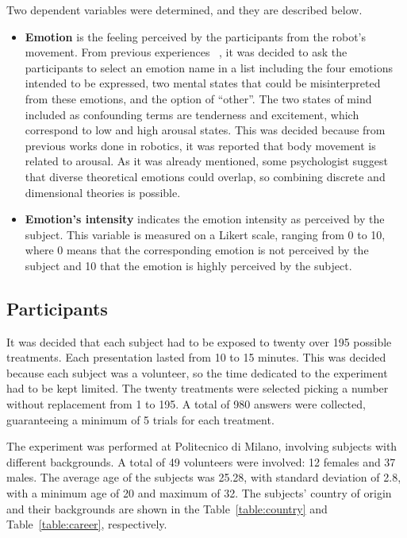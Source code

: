 Two dependent variables were determined, and they are described below.

\begin{itemize}
	\item \textbf{Emotion} is the feeling perceived by the participants from the robot's movement. From previous experiences~\cite{angel2014}
	, it was decided to ask the participants to select an emotion name in a list including the four emotions intended to be expressed, two mental states that could be misinterpreted from these emotions, and the option of ``other''.
	The two  states of mind included as confounding terms are tenderness and excitement, which correspond to low and high arousal states. This was decided because from previous works done in robotics, it was reported that body movement is related to arousal. As it was already mentioned, some psychologist suggest that diverse theoretical emotions could overlap, so combining discrete and dimensional theories is possible.
	
	\item \textbf{Emotion's intensity} indicates the emotion intensity as perceived by the subject. This variable is measured on a Likert scale, ranging from 0 to 10, where 0 means that the corresponding emotion is not perceived by the subject and 10 that the emotion is highly perceived by the subject. 

\end{itemize}

\subsection{Participants}

It was decided that each subject had to be exposed to twenty over 195 possible treatments. Each presentation lasted  from 10 to 15 minutes. This was decided because each subject was a volunteer, so the time dedicated to the experiment had to be kept limited. The twenty treatments were selected picking a number without replacement from 1 to 195. A total of 980 answers were collected, guaranteeing a minimum of 5 trials for each treatment. 

The experiment was performed at Politecnico di Milano, involving subjects with different backgrounds.
A total of 49 volunteers were involved: 12 females and 37 males. The average age of the subjects was 25.28, with standard deviation of 2.8, with a minimum age of 20 and maximum of 32. The subjects' country of origin and their backgrounds are shown in the Table~\ref{table:country} and Table~\ref{table:career}, respectively. 

